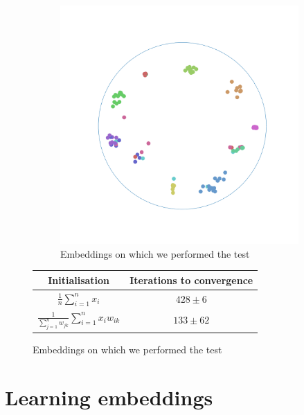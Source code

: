 \documentclass{article}
\begin{document}
            \begin{figure}[!ht]
                \centering
                \begin{subfigure}[b]{0.60\linewidth}
                    \centering
                    \includegraphics[scale=0.15]{media/embedding_barycenter_search.png}
                    \caption{Embeddings on which we performed the test}
                \end{subfigure}


                    \begin{tabular}{|c|c|}

                        \hline
                        Initialisation & Iterations to convergence \\
                        \hline
                        $\frac{1}{n}\sum \limits_{i=1}^n x_i$ & $428 \pm 6$  \\
                        $\frac{1}{\sum \limits_{j=1}^n w_{jk}}\sum \limits_{i=1}^n x_iw_{ik}$  & $133 \pm 62$ \\
                        \hline
                    \end{tabular}

            \end{figure}

    \section{Learning embeddings}
\end{document}
